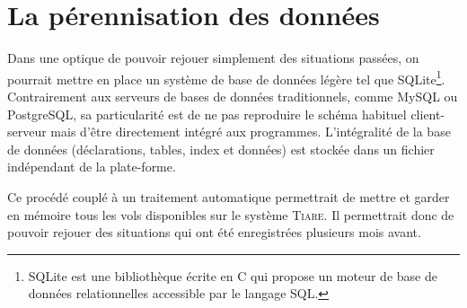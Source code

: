 \section{La pérennisation des données}
Dans une optique de pouvoir rejouer simplement des situations passées, on pourrait mettre en place un système de base de données légère tel que SQLite\footnote{SQLite est une bibliothèque écrite en C qui propose un moteur de base de données relationnelles accessible par le langage SQL.}. Contrairement aux serveurs de bases de données traditionnels, comme MySQL ou PostgreSQL, sa particularité est de ne pas reproduire le schéma habituel client-serveur mais d'être directement intégré aux programmes. L'intégralité de la base de données (déclarations, tables, index et données) est stockée dans un fichier indépendant de la plate-forme.

Ce procédé couplé à un traitement automatique permettrait de mettre et garder en mémoire tous les vols disponibles sur le système \textsc{Tiare}. Il permettrait donc de pouvoir rejouer des situations qui ont été enregistrées plusieurs mois avant. 



